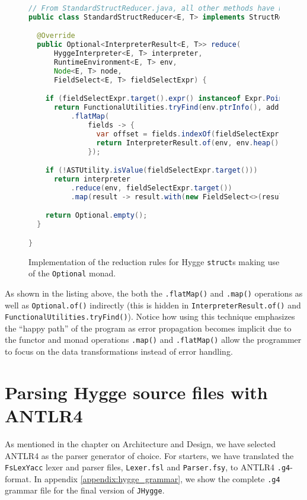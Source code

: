 \begin{figure}[H]
\centering  
\begin{lstlisting}[language=Java]
// From StandardStructReducer.java, all other methods have been redacted ...
public class StandardStructReducer<E, T> implements StructReducer<E, T> {

  @Override
  public Optional<InterpreterResult<E, T>> reduce(
      HyggeInterpreter<E, T> interpreter,
      RuntimeEnvironment<E, T> env,
      Node<E, T> node,
      FieldSelect<E, T> fieldSelectExpr) {

    if (fieldSelectExpr.target().expr() instanceof Expr.Pointer<E, T>(int address))
      return FunctionalUtilities.tryFind(env.ptrInfo(), address)
          .flatMap(
              fields -> {
                var offset = fields.indexOf(fieldSelectExpr.field());
                return InterpreterResult.of(env, env.heap().get(address + offset));
              });

    if (!ASTUtility.isValue(fieldSelectExpr.target()))
      return interpreter
          .reduce(env, fieldSelectExpr.target())
          .map(result -> result.with(new FieldSelect<>(result.node(), fieldSelectExpr.field())));

    return Optional.empty();
  }

}
\end{lstlisting}
\caption{Implementation of the reduction rules for Hygge \texttt{struct}s making use of the \texttt{Optional} monad.}
\label{fig:struct_reducer_monads}
\end{figure}

As shown in the listing above, the both the \texttt{.flatMap()} and \texttt{.map()} operations as well as \texttt{Optional.of()}
indirectly (this is hidden in \texttt{InterpreterResult.of()} and \texttt{FunctionalUtilities.tryFind()}). Notice how using
this technique emphasizes the ``happy path'' of the program as error propagation becomes implicit due to the functor and monad
operations \texttt{.map()} and \texttt{.flatMap()} allow the programmer to focus on the data transformations instead of error
handling.

\section{Parsing Hygge source files with ANTLR4}

As mentioned in the chapter on Architecture and Design, we have selected ANTLR4 as the parser generator of choice. For starters,
we have translated the \texttt{FsLexYacc} lexer and parser files, \texttt{Lexer.fsl} and \texttt{Parser.fsy}, to ANTLR4
\texttt{.g4}-format. In appendix \ref{appendix:hygge_grammar}, we show the complete \texttt{.g4} grammar file for the final version of \texttt{JHygge}.


